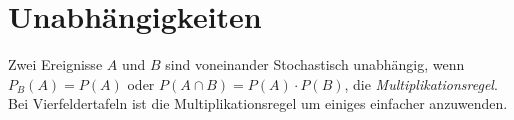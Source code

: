 \documentclass{article}
\begin{document}
 
\section{Unabhängigkeiten} 
Zwei Ereignisse $A$ und $B$ sind voneinander Stochastisch unabhängig, wenn $P_B(A)=P(A)$ oder $P(A \cap B) = P(A) \cdot P(B)$, die \emph{Multiplikationsregel}. Bei Vierfeldertafeln ist die Multiplikationsregel um einiges einfacher anzuwenden.
\end{document}
